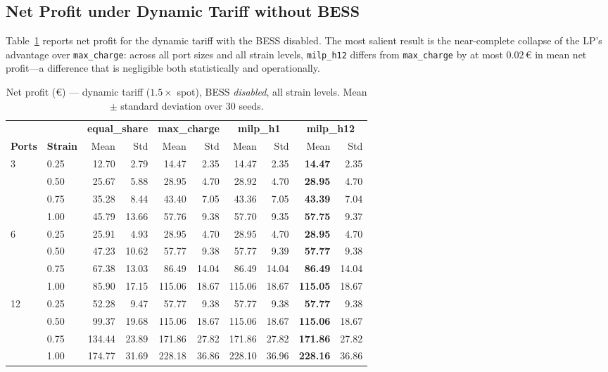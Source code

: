 \subsection{Net Profit under Dynamic Tariff without BESS}
\label{subsec:gc_dynamic_nobess}

Table~\ref{tab:gc_dynamic_nobess_profit} reports net profit for the dynamic
tariff with the BESS disabled.  The most salient result is the near-complete
collapse of the LP's advantage over \texttt{max\_charge}: across all port
sizes and all strain levels, \texttt{milp\_h12} differs from
\texttt{max\_charge} by at most $0.02$\,€ in mean net profit—a difference that
is negligible both statistically and operationally.

\begin{table}[!htb]
\centering
\caption{Net profit (€) — dynamic tariff ($1.5\times$ spot), BESS \emph{disabled},
         all strain levels. Mean $\pm$ standard deviation over 30 seeds.}
\label{tab:gc_dynamic_nobess_profit}
\setlength{\tabcolsep}{4.5pt}
\begin{tabular}{ll rrrrrrrr}
\toprule
 & & \multicolumn{2}{c}{\textbf{equal\_share}}
   & \multicolumn{2}{c}{\textbf{max\_charge}}
   & \multicolumn{2}{c}{\textbf{milp\_h1}}
   & \multicolumn{2}{c}{\textbf{milp\_h12}} \\
\cmidrule(lr){3-4}\cmidrule(lr){5-6}\cmidrule(lr){7-8}\cmidrule(lr){9-10}
\textbf{Ports} & \textbf{Strain} &
  Mean & Std & Mean & Std & Mean & Std & Mean & Std \\
\midrule
\multirow{4}{*}{3}
  & 0.25 &  12.70 &  2.79 &  14.47 &  2.35 &  14.47 &  2.35 & \textbf{14.47} &  2.35 \\
  & 0.50 &  25.67 &  5.88 &  28.95 &  4.70 &  28.92 &  4.70 & \textbf{28.95} &  4.70 \\
  & 0.75 &  35.28 &  8.44 &  43.40 &  7.05 &  43.36 &  7.05 & \textbf{43.39} &  7.04 \\
  & 1.00 &  45.79 & 13.66 &  57.76 &  9.38 &  57.70 &  9.35 & \textbf{57.75} &  9.37 \\
\midrule
\multirow{4}{*}{6}
  & 0.25 &  25.91 &  4.93 &  28.95 &  4.70 &  28.95 &  4.70 & \textbf{28.95} &  4.70 \\
  & 0.50 &  47.23 & 10.62 &  57.77 &  9.38 &  57.77 &  9.39 & \textbf{57.77} &  9.38 \\
  & 0.75 &  67.38 & 13.03 &  86.49 & 14.04 &  86.49 & 14.04 & \textbf{86.49} & 14.04 \\
  & 1.00 &  85.90 & 17.15 & 115.06 & 18.67 & 115.06 & 18.67 & \textbf{115.05} & 18.67 \\
\midrule
\multirow{4}{*}{12}
  & 0.25 &  52.28 &  9.47 &  57.77 &  9.38 &  57.77 &  9.38 & \textbf{57.77} &  9.38 \\
  & 0.50 &  99.37 & 19.68 & 115.06 & 18.67 & 115.06 & 18.67 & \textbf{115.06} & 18.67 \\
  & 0.75 & 134.44 & 23.89 & 171.86 & 27.82 & 171.86 & 27.82 & \textbf{171.86} & 27.82 \\
  & 1.00 & 174.77 & 31.69 & 228.18 & 36.86 & 228.10 & 36.96 & \textbf{228.16} & 36.86 \\
\bottomrule
\end{tabular}
\end{table}


